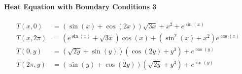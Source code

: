 \paragraph{Heat Equation with Boundary Conditions 3}
\label{para:heat3}
\begin{align*}
    T(x, 0) &= \left(\sin(x) + \cos(2x) \right) \sqrt{3x} + x^2 + e^{\sin(x)} \\
    T(x, 2\pi) &= \left(e^{\sin(x)} + \sqrt{3x} \right) \cos(x) + \left(\sin^2(x) + x^2\right)  e^{\cos(x)}
    \\
    T(0, y) &= \left(\sqrt{2y} + \sin(y)\right)  \left(\cos(2y) + y^3 \right) + e^{\cos(y)}\\
    T(2\pi, y) &= \left(\sin(y) + \cos(2y)\right) \left(\sqrt{2y} + y^3\right) + e^{\sin(y)}
\end{align*}
 





